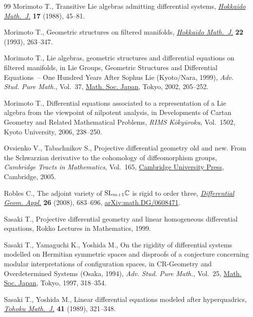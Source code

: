 \documentclass[10pt,a4paper]{amsart}
\numberwithin{equation}{section}
\begin{document}
\begin{thebibliography}{99}
Morimoto T., Transitive {L}ie algebras admitting differential systems,
 \href{https://doi.org/10.14492/hokmj/1381517794}{\textit{Hokkaido Math.~J.}} \textbf{17} (1988), 45--81.

Morimoto T., Geometric structures on filtered manifolds, \href{https://doi.org/10.14492/hokmj/1381413178}{\textit{Hokkaido
 Math.~J.}} \textbf{22} (1993), 263--347.

Morimoto T., Lie algebras, geometric structures and differential equations on
 filtered manifolds, in Lie Groups, Geometric Structures and Differential
 Equations~-- One Hundred Years After {S}ophus {L}ie ({K}yoto/{N}ara, 1999),
 \textit{Adv. Stud. Pure Math.}, Vol.~37, \href{https://doi.org/10.2969/aspm/03710205}{Math. Soc. Japan}, Tokyo, 2002,
 205--252.

Morimoto T., Differential equations associated to a representation of a {L}ie
 algebra from the viewpoint of nilpotent analysis, in Developments of Cartan
 Geometry and Related Mathematical Problems, \textit{RIMS K\=oky\=uroku}, Vol.~1502, Kyoto University, 2006, 238--250.

Ovsienko V., Tabachnikov S., Projective differential geometry old and new. From
 the Schwarzian derivative to the cohomology of diffeomorphism groups,
 \textit{Cambridge Tracts in Mathematics}, Vol.~165, \href{https://doi.org/10.1017/CBO9780511543142}{Cambridge University
 Press}, Cambridge, 2005.

Robles C., The adjoint variety of {${\rm SL}_{m+1}\mathbb C$} is rigid to order
 three, \href{https://doi.org/10.1016/j.difgeo.2008.04.017}{\textit{Differential Geom. Appl.}} \textbf{26} (2008), 683--696,
 \href{https://arxiv.org/abs/math.DG/0608471}{arXiv:math.DG/0608471}.

Sasaki T., Projective differential geometry and linear homogeneous differential
 equations, {R}okko Lectures in Mathematics, 1999.

Sasaki T., Yamaguchi K., Yoshida M., On the rigidity of differential systems
 modelled on {H}ermitian symmetric spaces and disproofs of a conjecture
 concerning modular interpretations of configuration spaces, in C{R}-Geometry
 and Overdetermined Systems ({O}saka, 1994), \textit{Adv. Stud. Pure Math.},
 Vol.~25, \href{https://doi.org/10.2969/aspm/02510318}{Math. Soc. Japan}, Tokyo, 1997, 318--354.

Sasaki T., Yoshida M., Linear differential equations modeled after
 hyperquadrics, \href{https://doi.org/10.2748/tmj/1178227829}{\textit{Tohoku Math.~J.}} \textbf{41} (1989), 321--348.


\end{thebibliography}
\end{document}
